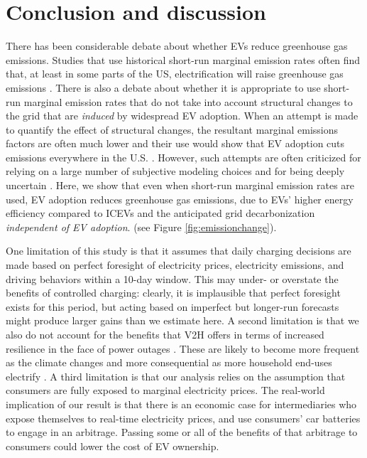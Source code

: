 \documentclass[11pt,preprint]{elsarticle}
\begin{document}
\section{Conclusion and discussion}


There has been considerable debate about whether EVs reduce greenhouse gas emissions. Studies that use historical short-run marginal emission rates often find that, at least in some parts of the US, electrification will raise greenhouse gas emissions \cite{singh_ensuring_2024,holland_why_2022}. There is also a debate about whether it is appropriate to use short-run marginal emission rates that do not take into account structural changes to the grid that are \textit{induced} by widespread EV adoption\cite{holland_why_2022,gagnon_short-run_2022,vaishnav_how_2023}. When an attempt is made to quantify the effect of structural changes, the resultant marginal emissions factors are often much lower and their use would show that EV adoption cuts emissions everywhere in the U.S. \cite{gagnon_planning_2022}. However, such attempts are often criticized for relying on a large number of subjective modeling choices and for being deeply uncertain \cite{holland_why_2022,gagnon_short-run_2022}. Here, we show that even when short-run marginal emission rates are used, EV adoption reduces greenhouse gas emissions, due to EVs' higher energy efficiency compared to ICEVs and  the anticipated grid decarbonization \textit{independent of EV adoption}.  (see Figure \ref{fig:emissionchange}). 


One limitation of this study is that it assumes that daily charging decisions are made based on perfect foresight of electricity prices, electricity emissions, and driving behaviors within a 10-day window. This may under- or overstate the benefits of controlled charging: clearly, it is implausible that perfect foresight exists for this period, but acting based on imperfect but longer-run forecasts might produce larger gains than we estimate here. A second limitation is that we also do not account for the benefits that V2H offers in terms of increased resilience in the face of power outages \cite{ahmad_increase_2021,perera_quantifying_2020,v_spatiotemporal_2023}. These are likely to become more frequent as the climate changes and more consequential as more household end-uses electrify \cite{noauthor_surging_2022}. A third limitation is that our analysis relies on the assumption that consumers are fully exposed to marginal electricity prices. The real-world implication of our result is that there is an economic case for intermediaries who expose themselves to real-time electricity prices, and use consumers' car batteries to engage in an arbitrage. Passing some or all of the benefits of that arbitrage to consumers could lower the cost of EV ownership. 
\end{document}
